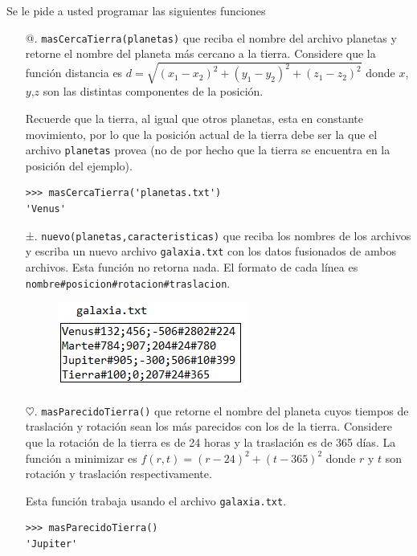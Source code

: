 Se le pide a usted programar las siguientes funciones
\begin{itemize}
    \item[@.] \texttt{masCercaTierra(planetas)} que reciba el nombre del archivo planetas y retorne el nombre del planeta más cercano a la tierra. Considere que la función distancia es $d=\sqrt{(x_1 -x_2)^2 + (y_1 - y_2)^2 + (z_1 - z_2)^2}$ donde $x$,$y$,$z$ son las distintas componentes de la posición.
    
    Recuerde que la tierra, al igual que otros planetas, esta en constante movimiento, por lo que la posición actual de la tierra debe ser la que el archivo \texttt{planetas} provea (no de por hecho que la tierra se encuentra en la posición del ejemplo).

\begin{lstlisting}[style=consola]
>>> masCercaTierra('planetas.txt')
'Venus'    
\end{lstlisting}
    \item[±.] \texttt{nuevo(planetas,caracteristicas)} que reciba los nombres de los archivos y escriba un nuevo archivo \texttt{galaxia.txt} con los datos fusionados de ambos archivos. Esta función no retorna nada. El formato de cada línea es \texttt{nombre\#posicion\#rotacion\#traslacion}.

\begin{figure}[h]
    \centering
    \includegraphics{Imagenes/galaxia.png}
\end{figure}
    
    \item[$\heartsuit$.] \texttt{masParecidoTierra()} que retorne el nombre del planeta cuyos tiempos de traslación y rotación sean los más parecidos con los de la tierra. Considere que la rotación de la tierra es de 24 horas y la traslación es de 365 días. La función a minimizar es $f(r,t)=(r-24)^2 + (t-365)^2$ donde $r$ y $t$ son rotación y traslación respectivamente.
    
    Esta función trabaja usando el archivo \texttt{galaxia.txt}.

\begin{lstlisting}[style=consola]
>>> masParecidoTierra()
'Jupiter'
\end{lstlisting}
\end{itemize}
